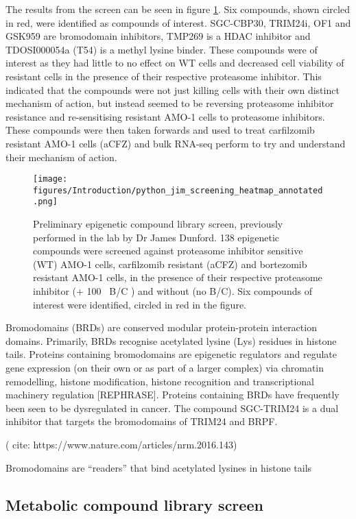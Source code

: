 The results from the screen can be seen in figure \ref{fig:compound_screen}.
Six compounds, shown circled in red, were identified as compounds of interest.
SGC-CBP30, TRIM24i, OF1 and GSK959 are bromodomain inhibitors, TMP269 is a HDAC inhibitor and TDOSI000054a (T54) is a methyl lysine binder.
These compounds were of interest as they had little to no effect on WT cells and decreased cell viability of resistant cells in the presence of their respective proteasome inhibitor.
This indicated that the compounds were not just killing cells with their own distinct mechanism of action, but instead seemed to be reversing proteasome inhibitor resistance and re-sensitising resistant AMO-1 cells to proteasome inhibitors.
These compounds were then taken forwards and used to treat carfilzomib resistant AMO-1 cells (aCFZ) and bulk RNA-seq perform to try and understand their mechanism of action.

\begin{figure}[hp]
\centering\texttt{[image: figures/Introduction/python\_jim\_screening\_heatmap\_annotated.png]}
\caption[Epigenentic compound library screen]{Preliminary epigenetic compound library screen, previously performed in the lab by Dr James Dunford.
138 epigenetic compounds were screened against proteasome inhibitor sensitive (WT) AMO-1 cells, carfilzomib resistant (aCFZ) and bortezomib resistant AMO-1 cells, in the presence of their respective proteasome inhibitor (+ 100\si{\nano\Molar} B/C ) and without (no B/C).
Six compounds of interest were identified, circled in red in the figure.}
\label{fig:compound_screen}
\end{figure}



Bromodomains (BRDs) are conserved modular protein-protein interaction domains.
Primarily, BRDs recognise acetylated lysine (Lys) residues in histone tails.
Proteins containing bromodomains are epigenetic regulators and regulate gene expression (on their own or as part of a larger complex) via chromatin remodelling, histone modification, histone recognition and transcriptional machinery regulation [REPHRASE].
Proteins containing BRDs have frequently been seen to be dysregulated in cancer.
The compound SGC-TRIM24 is a dual inhibitor that targets the bromodomains of TRIM24 and BRPF.


( cite: https://www.nature.com/articles/nrm.2016.143)


Bromodomains are ``readers'' that bind acetylated lysines in histone tails


\subsection{Metabolic compound library screen}